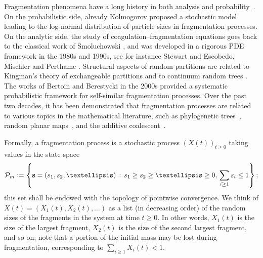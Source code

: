 \documentclass[a4,12pt]{amsart}
\numberwithin{equation}{section}
\newcommand{\MassP}{\mathcal{P}_{\rm m}}
\begin{document}
    Fragmentation phenomena have a long history in both analysis and probability~\cite{fu, BD1, BD2, evans1998stationary, aldous1998standard}. 
    On the probabilistic side, already Kolmogorov \cite{kolmogorov} proposed 
    a stochastic model leading to the log-normal distribution of particle sizes 
    in fragmentation processes. 
    On the analytic side, the study of coagulation–fragmentation equations goes 
    back to the classical work of Smoluchowski \cite{Smoluchowski1916}, and was 
    developed in a rigorous PDE framework in the 1980s and 1990s, see for instance 
    Stewart \cite{Stewart1989} and Escobedo, Mischler and Perthame 
    \cite{EscobedoMischlerPerthame2003}. 
    Structural aspects of random partitions are related to Kingman's theory of 
    exchangeable partitions \cite{Kingman1978} and to continuum random trees 
    \cite{Aldous1991}. 
    The works of Bertoin \cite{bertoin1, bertoin2, bertoin3} and Berestycki \cite{Berestycki} 
    in the 2000s provided a systematic probabilistic framework for self-similar 
    fragmentation processes. Over the past two decades, it has been demonstrated that fragmentation processes are related to various topics in the mathematical literature, such as phylogenetic trees~\cite{haas2008continuum}, random planar maps~\cite{bertoin2018random,bertoin2018martingales}, and the additive coalescent~\cite{miermont2001ordered}.
    
	Formally, a fragmentation process is a stochastic process $(X(t))_{t \geq 0}$ 
	taking values in the state space
	\begin{align*}
		\MassP:=\left\{ \mathbf{s}=(s_1,s_2,\ldots) \,:\, 
		s_1 \geq s_2 \geq \ldots \geq 0, \, \sum_{i \geq 1} s_i \leq 1\right\};
	\end{align*}
    	this set shall be endowed with the topology of pointwise convergence.
	We think of $X(t) = (X_1(t), X_2(t),\ldots)$ as a list (in decreasing order) 
	of the random sizes of the fragments in the system at time 
	$t \geq 0$. In other words, $X_1(t)$ is the size of the 
	largest fragment, $X_2(t)$ is the size of the second largest fragment, and so on; 
	note that a portion of the initial mass may be lost during fragmentation, 
	corresponding to $\sum_{i \geq 1} X_i(t) < 1$.
\end{document}
